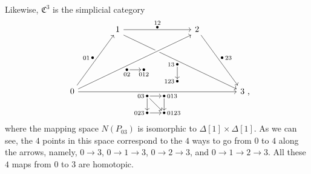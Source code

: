 Likewise, $\mathfrak C^3$ is the simplicial category
\[\begin{tikzcd}[row sep=6em,column sep=4em]
    & 1 \arrow{rr}[inner sep=0pt]{
    \begin{tikzpicture}[every node/.style={inner sep=1pt},
                        every label/.style={inner sep=0pt}]
        \node[label=above:12]{\bullet};
    \end{tikzpicture}}
    \arrow[start anchor=south east]{drrr}[pos=.5,swap,inner sep=0pt]{
    \begin{tikzpicture}[node distance=2em,
                        every node/.style={inner sep=1pt},
                        every label/.style={inner sep=0pt}]
        \node(13)[label=left:13]{\bullet}; 
        \node(123)[below of=13,label=left:123]{\bullet};
        \draw[->](13)--(123);
    \end{tikzpicture}}
    && 2 \arrow{dr}[inner sep=0pt]{
    \begin{tikzpicture}[every node/.style={inner sep=1pt},
                        every label/.style={inner sep=0pt}]
        \node[label=right:23]{\bullet};
    \end{tikzpicture}} \\
    0 \arrow{ur}[inner sep=0pt]{
    \begin{tikzpicture}[every node/.style={inner sep=1pt},
                        every label/.style={inner sep=0pt}]
        \node[label=left:01]{\bullet};
    \end{tikzpicture}}
    \arrow[crossing over,crossing over clearance=1ex,end anchor=south west]{urrr}
    [pos=.4,swap,inner sep=0pt]{
    \begin{tikzpicture}[node distance=2em,
                        every node/.style={inner sep=1pt},
                        every label/.style={inner sep=0pt}]
        \node(02)[label=below:02]{\bullet}; 
        \node(012)[right of=02,label=below:012]{\bullet};
        \draw[->](02)--(012);
    \end{tikzpicture}}
    \arrow{rrrr}[swap]{
    \begin{tikzpicture}[node distance=2em,
                        every node/.style={inner sep=1pt},
                        every label/.style={inner sep=0pt}]
        \node(03)[label=left:03]{\bullet}; 
        \node(023)[below of=03,label=left:023]{\bullet};
        \node(013)[right of=03,label=right:013]{\bullet}; 
        \node(0123)[below of=013,label=right:0123]{\bullet};
        \draw[->](03)--(013);
        \draw[->](03)--(023);
        \draw[->](013)--(0123);
        \draw[->](023)--(0123);
        \draw[->](03)--(0123);
    \end{tikzpicture}}
    &&&& 3\rlap{\ ,}
\end{tikzcd}\]
where the mapping space $N(P_{03})$
is isomorphic to $\Delta[1]\times\Delta[1]$.
As we can see, the $4$ points in this space 
correspond to the $4$ ways to go from $0$ to $4$ along the arrows,
namely, $0\to3$, $0\to1\to3$, $0\to2\to3$, and $0\to1\to2\to3$.
All these $4$ maps from $0$ to $3$ are homotopic.

